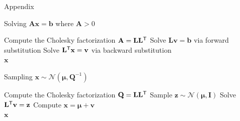 \documentclass[xcolor=svgnames, 10pt, aspectratio=169]{beamer}
\newcommand\transpose[1]{{#1}^{\sf{T}}}
\begin{document}
\begin{frame}{Appendix}{\citet[][Algorithm 2.1, 2.4]{rueheld_book2005}}
    \label{app_rueheld_algs}
    \setcounter{algorithm}{0}
    \begin{algorithm}[H]
        \caption{Solving $\mathbf{A} \mathbf{x} = \mathbf{b}$ where $\mathbf{A} > 0$}
        \begin{algorithmic}[1]
            \State Compute the Cholesky factorization $\mathbf{A} = \mathbf{L}\transpose{\mathbf{L}}$
            \State Solve $\mathbf{L}\mathbf{v} = \mathbf{b}$ via forward substitution
            \State Solve $\transpose{\mathbf{L}}\mathbf{x} = \mathbf{v}$ via backward substitution\\
            \Return $\mathbf{x}$
        \end{algorithmic}
    \end{algorithm}
    \setcounter{algorithm}{3}
    \begin{algorithm}[H]
        \caption{Sampling $\mathbf{x} \sim \mathcal{N}(\boldsymbol{\mu}, \mathbf{Q}^{-1})$}
        \begin{algorithmic}[1]
            \State Compute the Cholesky factorization $\mathbf{Q} = \mathbf{L}\transpose{\mathbf{L}}$
            \State Sample $\mathbf{z} \sim \mathcal{N}(\boldsymbol{\mu}, \mathbf{I})$
            \State Solve $\transpose{\mathbf{L}} \mathbf{v} = \mathbf{z}$
            \State Compute $\mathbf{x} = \boldsymbol{\mu} + \mathbf{v}$\\
            \Return $\mathbf{x}$
        \end{algorithmic}
    \end{algorithm}

    \hyperlink{precsampl_draw_eta}{}
\end{frame}
\end{document}
